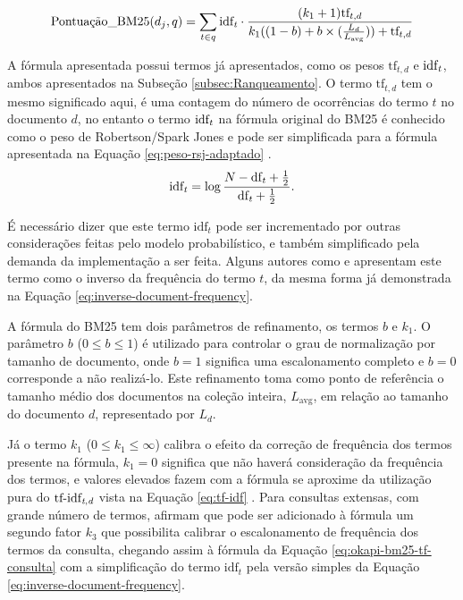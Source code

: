         \begin{equation}
            \label{eq:okapi-bm25}
    		\text{Pontuação\_BM25}(d_j, q) = \sum_{t \in q} \text{idf}_{\text{\textit{t}}} 
    		\cdot
    		\frac{(k_1 + 1) \text{tf}_{t,d}}{k_1((1-b)+b \times (\frac{L_d}{L_{\text{avg}}})) + \text{tf}_{t,d}} 
        \end{equation}
    
        A fórmula apresentada possui termos já apresentados, como os pesos $\text{tf}_{t,d}$ e $\text{idf}_{\text{\textit{t}}}$, ambos apresentados na Subseção \ref{subsec:Ranqueamento}.
        O termo $\text{tf}_{t,d}$ tem o mesmo significado aqui, é uma contagem do número de ocorrências do termo $t$ no documento $d$, no entanto o termo $\text{idf}_{\text{\textit{t}}}$ na fórmula original do BM25 é conhecido como o peso de Robertson/Spark Jones e pode ser simplificada para a fórmula apresentada na Equação \ref{eq:peso-rsj-adaptado} \cite[p.~347--349]{robertson_probabilistic_2010}.
        \begin{equation}
            \label{eq:peso-rsj-adaptado}
    		\text{idf}_{\text{\textit{t}}} = \log{\frac{N-\text{df}_{\text{\textit{t}}}+\frac{1}{2}}{\text{df}_{\text{\textit{t}}} + \frac{1}{2} }}.
        \end{equation}
        
        É necessário dizer que este termo $\text{idf}_{t}$ pode ser incrementado por outras considerações feitas pelo modelo probabilístico, e também simplificado pela demanda da implementação a ser feita.
        Alguns autores como  e  apresentam este termo como o inverso da frequência do termo $t$, da mesma forma já demonstrada na Equação \ref{eq:inverse-document-frequency}.
        
        A fórmula do BM25 tem dois parâmetros de refinamento, os termos $b$ e $k_1$. 
        O parâmetro $b$ ($0 \leq b \leq 1$) é utilizado para controlar o grau de normalização por tamanho de documento, onde $b=1$ significa uma escalonamento completo e $b=0$ corresponde a não realizá-lo. 
        Este refinamento toma como ponto de referência o tamanho médio dos documentos na coleção inteira, $L_{\text{avg}}$, em relação ao tamanho do documento $d$, representado por $L_d$.
        
        Já o termo $k_1$ ($0 \leq k_1 \leq \infty$) calibra o efeito da correção de frequência dos termos presente na fórmula, $k_1=0$ significa que não haverá consideração da frequência dos termos, e valores elevados fazem com a fórmula se aproxime da utilização pura do $\text{tf-idf}_{\text{\textit{t},\textit{d}}}$ vista na Equação \ref{eq:tf-idf} \cite[p.~214]{Manning2008IIR}.
        Para consultas extensas, com grande número de termos,  afirmam que pode ser adicionado à fórmula um segundo fator $k_3$ que possibilita calibrar o escalonamento de frequência dos termos da consulta, chegando assim à fórmula da Equação \ref{eq:okapi-bm25-tf-consulta} com a simplificação do termo $\text{idf}_{t}$ pela versão simples da Equação \ref{eq:inverse-document-frequency}.
        
